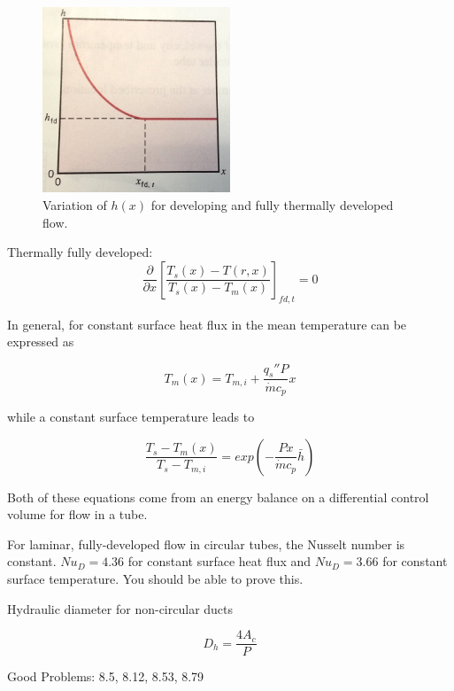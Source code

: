 \documentclass[paper=letter, fontsize=11pt]{scrartcl}
\numberwithin{equation}{section}        %
\numberwithin{figure}{section}          %
\numberwithin{table}{section}               %
\begin{document}
\begin{figure}[!ht]
\centering
\includegraphics[width=0.5\textwidth]{./Figures/hx}
\caption{Variation of $h(x)$ for developing and fully thermally developed flow.}
\end{figure}

Thermally fully developed:
\begin{equation}
    \frac{\partial}{\partial x}\left[\frac{T_s(x) - T(r,x)}{T_s(x) - T_m(x)}\right]_{fd,t} = 0
\end{equation}

In general, for constant surface heat flux in the mean temperature can be expressed as

\begin{equation}
T_m(x) = T_{m,i} + \frac{q_s'' P}{\dot m c_p}x
\end{equation}

\noindent while a constant surface temperature leads to 

\begin{equation}
\frac{T_s - T_m(x)}{T_s - T_{m,i}} = exp\left(-\frac{Px}{\dot m c_p}\bar h\right)
\end{equation}

Both of these equations come from an energy balance on a differential control volume for flow in a tube.

For laminar, fully-developed flow in circular tubes, the Nusselt number is constant. $Nu_D = 4.36$ for constant surface heat flux and $Nu_D=3.66$ for constant surface temperature. You should be able to prove this.

Hydraulic diameter for non-circular ducts

\begin{equation}
D_h = \frac{4A_c}{P}
\end{equation}

\bigskip Good Problems: 8.5, 8.12, 8.53, 8.79
\end{document}

